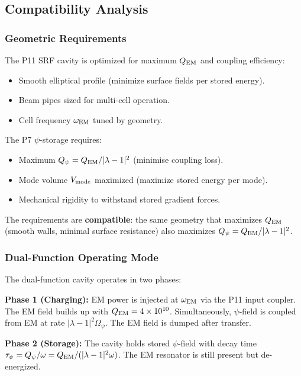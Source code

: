 \documentclass[aps,prd,twocolumn,superscriptaddress]{revtex4-2}
\newcommand{\Opsi}{\Omega_\psi}
\newcommand{\lam}{|\lambda-1|}
\begin{document}
\subsection{Compatibility Analysis}

\subsubsection{Geometric Requirements}

The P11 SRF cavity is optimized for maximum $Q_{\rm EM}$ and coupling
efficiency:
\begin{itemize}
\item Smooth elliptical profile (minimize surface fields per stored energy).
\item Beam pipes sized for multi-cell operation.
\item Cell frequency $\omega_{\rm EM}$ tuned by geometry.
\end{itemize}

The P7 $\psi$-storage requires:
\begin{itemize}
\item Maximum $Q_\psi = Q_{\rm EM}/\lam^2$ (minimise coupling loss).
\item Mode volume $V_{\rm mode}$ maximized (maximize stored energy per mode).
\item Mechanical rigidity to withstand stored gradient forces.
\end{itemize}

The requirements are \textbf{compatible}: the same geometry that
maximizes $Q_{\rm EM}$ (smooth walls, minimal surface resistance)
also maximizes $Q_\psi = Q_{\rm EM}/\lam^2$.

\subsubsection{Dual-Function Operating Mode}

The dual-function cavity operates in two phases:

\textbf{Phase 1 (Charging):}  EM power is injected at $\omega_{\rm EM}$
via the P11 input coupler.  The EM field builds up with $Q_{\rm EM} = 4\times 10^{10}$.
Simultaneously, $\psi$-field is coupled from EM at rate $\lam^2\Opsi$.
The EM field is dumped after transfer.

\textbf{Phase 2 (Storage):}  The cavity holds stored $\psi$-field
with decay time $\tau_\psi = Q_\psi/\omega = Q_{\rm EM}/(\lam^2\omega)$.
The EM resonator is still present but de-energized.
\end{document}
